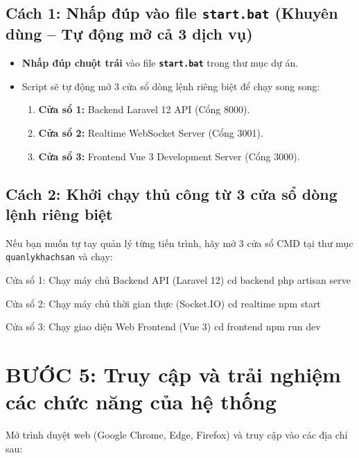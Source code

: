 \documentclass[11pt,a4paper]{article}
\begin{document}
\subsection*{Cách 1: Nhấp đúp vào file \texttt{start.bat} (Khuyên dùng -- Tự động mở cả 3 dịch vụ)}
\begin{itemize}[leftmargin=5mm,itemsep=1.5pt]
  \item \textbf{Nhấp đúp chuột trái} vào file \textbf{\texttt{start.bat}} trong thư mục dự án.
  \item Script sẽ tự động mở 3 cửa sổ dòng lệnh riêng biệt để chạy song song:
    \begin{enumerate}[itemsep=1pt]
      \item \textbf{Cửa sổ 1:} Backend Laravel 12 API (Cổng 8000).
      \item \textbf{Cửa sổ 2:} Realtime WebSocket Server (Cổng 3001).
      \item \textbf{Cửa sổ 3:} Frontend Vue 3 Development Server (Cổng 3000).
    \end{enumerate}
\end{itemize}

\subsection*{Cách 2: Khởi chạy thủ công từ 3 cửa sổ dòng lệnh riêng biệt}
Nếu bạn muốn tự tay quản lý từng tiến trình, hãy mở 3 cửa sổ CMD tại thư mục \texttt{quanlykhachsan} và chạy:

\begin{terminalcmd}{Cửa sổ 1: Chạy máy chủ Backend API (Laravel 12)}
cd backend
php artisan serve
\end{terminalcmd}

\begin{terminalcmd}{Cửa sổ 2: Chạy máy chủ thời gian thực (Socket.IO)}
cd realtime
npm start
\end{terminalcmd}

\begin{terminalcmd}{Cửa sổ 3: Chạy giao diện Web Frontend (Vue 3)}
cd frontend
npm run dev
\end{terminalcmd}

\section{BƯỚC 5: Truy cập và trải nghiệm các chức năng của hệ thống}

Mở trình duyệt web (Google Chrome, Edge, Firefox) và truy cập vào các địa chỉ sau:
\end{document}
